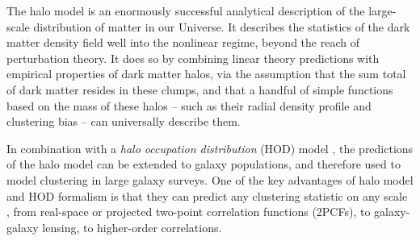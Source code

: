 \documentclass[5p,aas_macros]{elsarticle}
\newcommand{\bd}[1]{\textcolor{purple}{\textbf{[BD: #1]}}}
\begin{document}

The halo model \citep{Neyman1953,Peacock2000,Seljak2000,Ma2000,Cooray2002} is an enormously successful analytical description of the large-scale distribution of matter in our Universe.
It describes the statistics of the dark matter density field well into the nonlinear regime, beyond the reach of perturbation theory. 
It does so by combining linear theory predictions with empirical properties of dark matter halos, via the assumption that the sum total of dark matter resides in these clumps, and that a handful of simple functions based on the mass of these halos -- such as their radial density profile and clustering bias -- can universally describe them.

In combination with a \textit{halo occupation distribution} (HOD) model \citep{Kauffmann1997,Scoccimarro2001,Berlind2003,Zheng2005}, the predictions of the halo model can be extended to galaxy populations, and therefore used to model clustering in large galaxy surveys. 
One of the key advantages of halo model and HOD formalism is that they can predict any clustering statistic on any scale 
\citep{Zehavi2011}, from real-space or projected two-point correlation functions (2PCFs), to galaxy-galaxy lensing, to higher-order correlations.  
\end{document}
